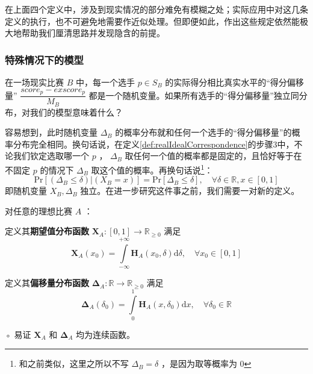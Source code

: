             在上面四个定义中，涉及到现实情况的部分难免有模糊之处；实际应用中对这几条定义的执行，也不可避免地需要作近似处理。但即便如此，作出这些规定依然能极大地帮助我们厘清思路并发现隐含的前提。

        \subsubsection{特殊情况下的模型}

            在一场现实比赛 $B$ 中，每一个选手 $p\in S_B$ 的实际得分相比真实水平的“得分偏移量” $\dfrac{\textit{score}_p-\textit{exscore}_p}{M_B}$ 都是一个随机变量。如果所有选手的“得分偏移量”独立同分布，对我们的模型意味着什么？

            容易想到，此时随机变量 $\Delta_B$ 的概率分布就和任何一个选手的“得分偏移量”的概率分布完全相同。换句话说，在定义\ref{def:realIdealCorrespondence}的步骤3中，不论我们钦定选取哪一个 $p$ ， $\Delta_B$ 取任何一个值的概率都是固定的，且恰好等于在不固定 $p$ 的情况下 $\Delta_B$ 取这个值的概率。再换句话说\footnote{和之前类似，这里之所以不写 $\Delta_B=\delta$ ，是因为取等概率为 $0$ }：$$\mathrm{Pr}\left[(\Delta_B\leq\delta)|(X_B=x)\right]=\mathrm{Pr}\left[\Delta_B\leq\delta\right],\quad\forall \delta\in\mathbb{R},x\in\left[0,1\right]$$即随机变量 $X_B,\Delta_B$ 独立。在进一步研究这件事之前，我们需要一对新的定义。

            \begin{definition}[期望值分布函数和偏移量分布函数]
                对任意的理想比赛 $A$ ：
                \begin{asparaitem}
                    \item 定义其\textbf{期望值分布函数} $\bm{X}_A:[0,1]\to\mathbb{R}_{\geq 0}$ 满足 $$\bm{X}_A(x_0)=\int\limits_{-\infty}^{+\infty}\bm{H}_A(x_0,\delta)\mathrm{d}\delta,\quad\forall x_0\in[0,1]$$
                    \item 定义其\textbf{偏移量分布函数} $\bm{\Delta}_A:\mathbb{R}\to\mathbb{R}_{\geq 0}$ 满足 $$\bm{\Delta}_A(\delta_0)=\int\limits_0^1\bm{H}_A(x,\delta_0)\mathrm{d}x,\quad\forall\delta_0\in\mathbb{R}$$
                    \item [◦] 易证 $\bm{X}_A$ 和 $\bm{\Delta}_A$ 均为连续函数。
                \end{asparaitem}
                \label{def:marginalDistributions}
            \end{definition}

